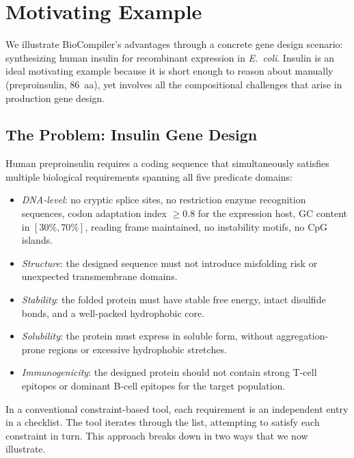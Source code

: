 \documentclass[acmsmall,review,anonymous]{acmart}
\begin{document}
\section{Motivating Example}\label{sec:motivating}

We illustrate BioCompiler's advantages through a concrete gene design
scenario: synthesizing human insulin for recombinant expression in
\emph{E.~coli}.
Insulin is an ideal motivating example because it is short enough to
reason about manually (preproinsulin, 86~aa), yet involves all the
compositional challenges that arise in production gene design.

\subsection{The Problem: Insulin Gene Design}

Human preproinsulin requires a coding sequence that simultaneously
satisfies multiple biological requirements spanning all five predicate
domains:
\begin{itemize}[leftmargin=*,itemsep=0pt,topsep=1pt]
\item \emph{DNA-level}: no cryptic splice sites, no restriction
      enzyme recognition sequences, codon adaptation index $\ge 0.8$
      for the expression host, GC content in $[30\%, 70\%]$, reading
      frame maintained, no instability motifs, no CpG islands.
\item \emph{Structure}: the designed sequence must not introduce
      misfolding risk or unexpected transmembrane domains.
\item \emph{Stability}: the folded protein must have stable free
      energy, intact disulfide bonds, and a well-packed hydrophobic
      core.
\item \emph{Solubility}: the protein must express in soluble form,
      without aggregation-prone regions or excessive hydrophobic
      stretches.
\item \emph{Immunogenicity}: the designed protein should not contain
      strong T-cell epitopes or dominant B-cell epitopes for the
      target population.
\end{itemize}

\noindent In a conventional constraint-based tool, each requirement is
an independent entry in a checklist.
The tool iterates through the list, attempting to satisfy each
constraint in turn.
This approach breaks down in two ways that we now illustrate.
\end{document}
